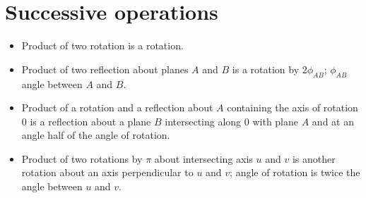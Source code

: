 \section*{Successive operations}
\begin{itemize}
\item Product of two rotation is a rotation.

\item Product of two reflection about planes $A$ and $B$ is a rotation by $2\phi_{AB}$; $\phi_{AB}$ angle between $A$ and $B$.

\item Product of a rotation and a reflection about $A$ containing the axis of rotation $0$ is a reflection about a plane $B$ intersecting along $0$ with plane $A$ and at an angle half of the angle of rotation.

\item Product of two rotations by $\pi$ about intersecting axis $u$ and $v$ is another rotation about an axis perpendicular to $u$ and $v$; angle of rotation is twice the angle between $u$ and $v$.


\end{itemize}
